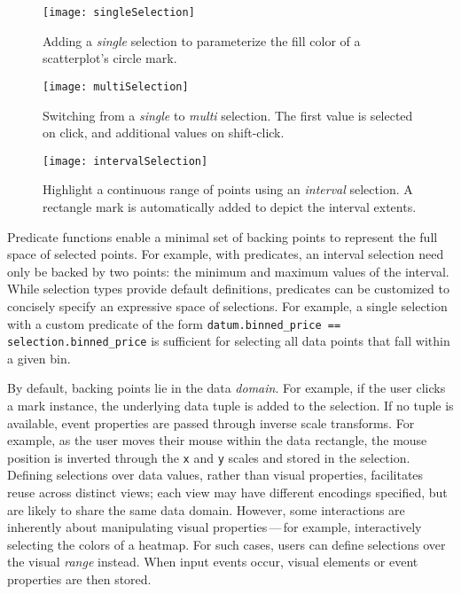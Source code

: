 \begin{figure*}[h!]
  \centering
  \texttt{[image: singleSelection]}
  \caption{Adding a \emph{single} selection to parameterize the fill color
  of a scatterplot's circle mark.}
  \label{fig:vl:singleSelection}
\end{figure*}

\begin{figure*}[h!]
  \centering
  \texttt{[image: multiSelection]}
  \caption{Switching from a \emph{single} to \emph{multi} selection. The first
  value is selected on click, and additional values on shift-click.}
  \label{fig:vl:multiSelection}
\end{figure*}

\begin{figure*}[h!]
  \centering
  \texttt{[image: intervalSelection]}
  \caption{Highlight a continuous range of points using an \emph{interval}
  selection. A rectangle mark is automatically added to depict the interval
  extents.}
  \label{fig:vl:intervalSelection}
\end{figure*}

Predicate functions enable a minimal set of backing points to represent the full
space of selected points. For example, with predicates, an interval selection
need only be backed by two points: the minimum and maximum values of the
interval. While selection types provide default definitions, predicates can be
customized to concisely specify an expressive space of selections. For example,
a single selection with a custom predicate of the form
\texttt{datum.binned\_price == selection.binned\_price} is sufficient for
selecting all data points that fall within a given bin.

By default, backing points lie in the data \emph{domain}. For example, if the
user clicks a mark instance, the underlying data tuple is added to the
selection. If no tuple is available, event properties are passed through inverse
scale transforms. For example, as the user moves their mouse within the data
rectangle, the mouse position is inverted through the \texttt{x} and \texttt{y}
scales and stored in the selection. Defining selections over data values, rather
than visual properties, facilitates reuse across distinct views; each view may
have different encodings specified, but are likely to share the same data
domain. However, some interactions are inherently about manipulating visual
properties\,---\,for example, interactively selecting the colors of a heatmap.
For such cases, users can define selections over the visual \emph{range}
instead. When input events occur, visual elements or event properties are then
stored.

